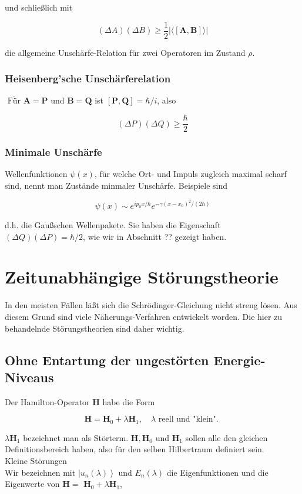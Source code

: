 \documentclass[10pt, letterpaper]{article}
\begin{document}
und schließlich mit

$$
(\Delta A)(\Delta B) \geq \frac{1}{2}|\langle[\mathbf{A}, \mathbf{B}]\rangle|
$$

die allgemeine Unschärfe-Relation für zwei Operatoren im Zustand $\rho$.

\subsubsection*{Heisenberg'sche Unschärferelation}
$\overline{\text { Für }} \mathbf{A}=\mathbf{P}$ und $\mathbf{B}=\mathbf{Q}$ ist $[\mathbf{P}, \mathbf{Q}]=\hbar / i$, also

$$
(\Delta P)(\Delta Q) \geq \frac{\hbar}{2}
$$

\subsubsection*{Minimale Unschärfe}
Wellenfunktionen $\psi(x)$, für welche Ort- und Impuls zugleich maximal scharf sind, nennt man Zustände minmaler Unschärfe. Beispiele sind

$$
\psi(x) \sim e^{i p_{0} x / \hbar} e^{-\gamma\left(x-x_{0}\right)^{2} /(2 \hbar)}
$$

d.h. die Gaußschen Wellenpakete. Sie haben die Eigenschaft $(\Delta Q)(\Delta P)=\hbar / 2$, wie wir in Abschnitt ?? gezeigt haben.


\pagebreak


\section{Zeitunabhängige Störungstheorie}

In den meisten Fällen läßt sich die Schrödinger-Gleichung nicht streng lösen. Aus diesem Grund sind viele Näherungs-Verfahren entwickelt worden. Die hier zu behandelnde Störungstheorien sind daher wichtig.

\subsection*{Ohne Entartung der ungestörten Energie-Niveaus}
Der Hamilton-Operator $\mathbf{H}$ habe die Form

$$
\mathbf{H}=\mathbf{H}_{0}+\lambda \mathbf{H}_{1}, \quad \lambda \text { reell und "klein". }
$$

$\lambda \mathbf{H}_{1}$ bezeichnet man als Störterm. $\mathbf{H}, \mathbf{H}_{0}$ und $\mathbf{H}_{1}$ sollen alle den gleichen Definitionsbereich haben, also für den selben Hilbertraum definiert sein.\\
Kleine Störungen\\
Wir bezeichnen mit $\left|u_{n}(\lambda)\right\rangle$ und $E_{n}(\lambda)$ die Eigenfunktionen und die Eigenwerte von $\mathbf{H}=$ $\mathbf{H}_{0}+\lambda \mathbf{H}_{1}$,
\end{document}
